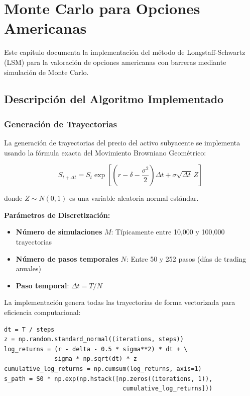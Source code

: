 \section{Monte Carlo para Opciones Americanas}
\label{sec:impl_montecarlo}

Este capítulo documenta la implementación del método de Longstaff-Schwartz (LSM) para la valoración de opciones americanas con barreras mediante simulación de Monte Carlo.

\subsection{Descripción del Algoritmo Implementado}

\subsubsection{Generación de Trayectorias}

La generación de trayectorias del precio del activo subyacente se implementa usando la fórmula exacta del Movimiento Browniano Geométrico:

\begin{equation}
S_{t+\Delta t} = S_t \exp\left[\left(r - \delta - \frac{\sigma^2}{2}\right)\Delta t + \sigma\sqrt{\Delta t}\, Z\right]
\end{equation}

donde $Z \sim N(0,1)$ es una variable aleatoria normal estándar.

\textbf{Parámetros de Discretización:}
\begin{itemize}
    \item \textbf{Número de simulaciones} $M$: Típicamente entre 10,000 y 100,000 trayectorias
    \item \textbf{Número de pasos temporales} $N$: Entre 50 y 252 pasos (días de trading anuales)
    \item \textbf{Paso temporal}: $\Delta t = T/N$
\end{itemize}

La implementación genera todas las trayectorias de forma vectorizada para eficiencia computacional:

\begin{verbatim}
dt = T / steps
z = np.random.standard_normal((iterations, steps))
log_returns = (r - delta - 0.5 * sigma**2) * dt + \
              sigma * np.sqrt(dt) * z
cumulative_log_returns = np.cumsum(log_returns, axis=1)
s_path = S0 * np.exp(np.hstack([np.zeros((iterations, 1)), 
                                 cumulative_log_returns]))
\end{verbatim}

